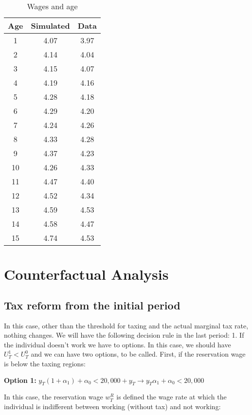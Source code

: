\documentclass[11pt]{article}
\begin{document}
\begin{table}[H]
  \centering
  \caption{Wages and age}
    \begin{tabular}{|c|c|c|}
    \hline
    \textbf{Age} & \textbf{Simulated} & \textbf{Data} \\
    \hline
    1     & 4.07  & 3.97 \\
    2     & 4.14  & 4.04 \\
    3     & 4.15  & 4.07 \\
    4     & 4.19  & 4.16 \\
    5     & 4.28  & 4.18 \\
    6     & 4.29  & 4.20 \\
    7     & 4.24  & 4.26 \\
    8     & 4.33  & 4.28 \\
    9     & 4.37  & 4.23 \\
    10    & 4.26  & 4.33 \\
    11    & 4.47  & 4.40 \\
    12    & 4.52  & 4.34 \\
    13    & 4.59  & 4.53 \\
    14    & 4.58  & 4.47 \\
    15    & 4.74  & 4.53 \\
    \hline
    \end{tabular}%
  \label{tab:addlabel}%
\end{table}%

\section{Counterfactual Analysis}

\subsection{Tax reform from the initial period}

In this case, other than the threshold for taxing and the actual marginal tax rate, nothing changes. We will have the following decision rule in the last period:
1. If the individual doesn't work we have to options. In this case, we should have $U_T^1<U_T^0$ and we can have two options, to be called. First, if the reservation wage is below the taxing regions:

\textbf{Option 1:} $y_T(1+\alpha_1)+\alpha_0<20,000+y_T\rightarrow y_T\alpha_1+\alpha_0<20,000$

In this case, the reservation wage $w_T^R$ is defined the wage rate at which the individual is indifferent between working (without tax) and not working:
\end{document}
